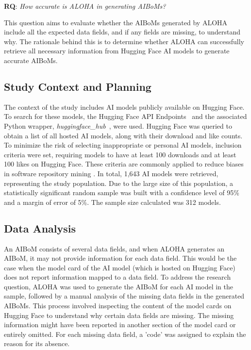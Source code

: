 \documentclass[12pt,a4paper, oneside, openright]{book}
\newcommand{\aibom}{{AIBoM}\xspace}
\newcommand{\aiboms}{{AIBoMs}\xspace}
\begin{document}
\textbf{RQ}:\textit{ How accurate is ALOHA in generating \aiboms?}

This question aims to evaluate whether the \aiboms generated by ALOHA include all the expected data fields, and if any fields are missing, to understand why. The rationale behind this is to determine whether ALOHA can successfully retrieve all necessary information from Hugging Face AI models to generate accurate \aiboms.

\subsection{Study Context and Planning}
The context of the study includes AI models publicly available on Hugging Face.
To search for these models, the Hugging Face API Endpoints~\cite{huggingface_api} and the associated Python wrapper, \textit{huggingface\_hub}~\cite{huggingface_hub}, were used.
Hugging Face was queried to obtain a list of all hosted AI models, along with their download and like counts.
To minimize the risk of selecting inappropriate or personal AI models, inclusion criteria were set, requiring models to have at least 100 downloads and at least 100 likes on Hugging Face.
These criteria are commonly applied to reduce biases in software repository mining \cite{kalliamvakou2014promises}.
In total, 1,643 AI models were retrieved, representing the study population.
Due to the large size of this population, a statistically significant random sample was built with a confidence level of 95\% and a margin of error of 5\%. The sample size calculated was 312 models.
\subsection{Data Analysis}
An \aibom consists of several data fields, and when ALOHA generates an \aibom, it may not provide information for each data field.
This would be the case when the model card of the AI model (which is hosted on Hugging Face) does not report information mapped to a data field. To address the research question, ALOHA was used to generate the \aibom for each AI model in the sample, followed by a manual analysis of the missing data fields in the generated \aiboms.  
This process involved inspecting the content of the model cards on Hugging Face to understand why certain data fields are missing. 
The missing information might have been reported in another section of the model card or entirely omitted.
For each missing data field, a 'code' was assigned to explain the reason for its absence.
\end{document}
